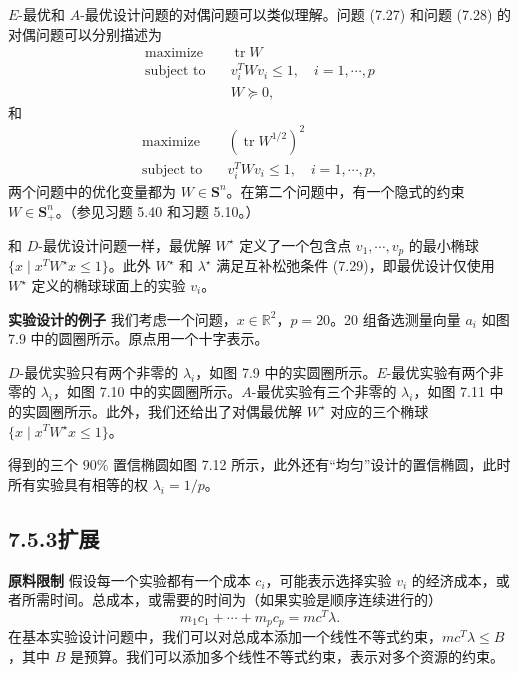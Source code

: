 \documentclass[UTF8,12pt,a4paper,fontset=fandol]{ctexart}
\begin{document}
$E$-最优和 $A$-最优设计问题的对偶问题可以类似理解。问题 (7.27) 和问题 (7.28) 的对偶问题可以分别描述为
\begin{equation}
\begin{aligned}
\text{maximize}\quad & \operatorname{tr}W\\
\text{subject to}\quad & v_i^TWv_i\leq 1,\quad i=1,\cdots,p\\
& W\succeq 0,
\end{aligned}
\tag{7.30}
\end{equation}
和
\begin{equation}
\begin{aligned}
\text{maximize}\quad & (\operatorname{tr}W^{1/2})^2\\
\text{subject to}\quad & v_i^TWv_i\leq 1,\quad i=1,\cdots,p,
\end{aligned}
\tag{7.31}
\end{equation}
两个问题中的优化变量都为 $W\in\mathbf{S}^n$。在第二个问题中，有一个隐式的约束 $W\in\mathbf{S}_+^n$。（参见习题 5.40 和习题 5.10。）

和 $D$-最优设计问题一样，最优解 $W^\star$ 定义了一个包含点 $v_1,\cdots,v_p$ 的最小椭球 $\{x\mid x^TW^\star x\leq 1\}$。此外 $W^\star$ 和 $\lambda^\star$ 满足互补松弛条件 (7.29)，即最优设计仅使用 $W^\star$ 定义的椭球球面上的实验 $v_i$。

\noindent\textbf{实验设计的例子}\quad
我们考虑一个问题，$x\in\mathbb{R}^2$，$p=20$。20 组备选测量向量 $a_i$ 如图 7.9 中的圆圈所示。原点用一个十字表示。

$D$-最优实验只有两个非零的 $\lambda_i$，如图 7.9 中的实圆圈所示。$E$-最优实验有两个非零的 $\lambda_i$，如图 7.10 中的实圆圈所示。$A$-最优实验有三个非零的 $\lambda_i$，如图 7.11 中的实圆圈所示。此外，我们还给出了对偶最优解 $W^\star$ 对应的三个椭球 $\{x\mid x^TW^\star x\leq 1\}$。

得到的三个 $90\%$ 置信椭圆如图 7.12 所示，此外还有“均匀”设计的置信椭圆，此时所有实验具有相等的权 $\lambda_i=1/p$。

\subsection*{7.5.3\quad 扩展}

\noindent\textbf{原料限制}\quad
假设每一个实验都有一个成本 $c_i$，可能表示选择实验 $v_i$ 的经济成本，或者所需时间。总成本，或需要的时间为（如果实验是顺序连续进行的）
\[
m_1c_1+\cdots+m_pc_p=mc^T\lambda.
\]
在基本实验设计问题中，我们可以对总成本添加一个线性不等式约束，$mc^T\lambda\leq B$，其中 $B$ 是预算。我们可以添加多个线性不等式约束，表示对多个资源的约束。
\end{document}
